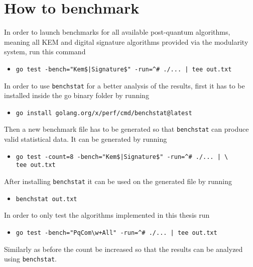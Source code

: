 \section{How to benchmark}
\label{sec:how_to_bench}
In order to launch benchmarks for all available post-quantum algorithms, meaning all KEM and digital signature algorithms provided via the modularity system, run this command
\begin{itemize}
  \item \texttt{go test -bench="Kem\$|Signature\$" -run=\^{}\# ./... | tee out.txt}
\end{itemize}
In order to use \texttt{benchstat} for a better analysis of the results, first it has to be installed inside the go binary folder by running
\begin{itemize}
  \item \texttt{go install golang.org/x/perf/cmd/benchstat@latest}
\end{itemize}
Then a new benchmark file has to be generated so that \texttt{benchstat} can produce valid statistical data. It can be generated by running
\begin{itemize}
  \item \texttt{go test -count=8 -bench="Kem\$|Signature\$" -run=\^{}\# ./... | \textbackslash\\tee out.txt}
\end{itemize}
After installing \texttt{benchstat} it can be used on the generated file by running
\begin{itemize}
  \item \texttt{benchstat out.txt}
\end{itemize}
In order to only test the algorithms implemented in this thesis run
\begin{itemize}
  \item \texttt{go test -bench="PqCom\textbackslash w+All" -run=\^{}\# ./... | tee out.txt}
\end{itemize}
Similarly as before the count be increased so that the results can be analyzed using \texttt{benchstat}.

